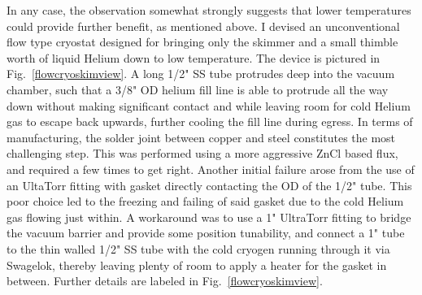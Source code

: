 
In any case, the observation somewhat strongly suggests that lower temperatures could provide further benefit, as mentioned above.
I devised an unconventional flow type cryostat designed for bringing only the skimmer and a small thimble worth of liquid Helium down to low temperature.
The device is pictured in Fig.~\ref{flowcryoskimview}.
A long 1/2" SS tube protrudes deep into the vacuum chamber, such that a 3/8" OD helium fill line is able to protrude all the way down without making significant contact and while leaving room for cold Helium gas to escape back upwards, further cooling the fill line during egress.
In terms of manufacturing, the solder joint between copper and steel constitutes the most challenging step.
This was performed using a more aggressive ZnCl based flux, and required a few times to get right.
Another initial failure arose from the use of an UltaTorr fitting with gasket directly contacting the OD of the 1/2" tube.
This poor choice led to the freezing and failing of said gasket due to the cold Helium gas flowing just within.
A workaround was to use a 1" UltraTorr fitting to bridge the vacuum barrier and provide some position tunability, and connect a 1" tube to the thin walled 1/2" SS tube with the cold cryogen running through it via Swagelok, thereby leaving plenty of room to apply a heater for the gasket in between.
Further details are labeled in Fig.~\ref{flowcryoskimview}.

